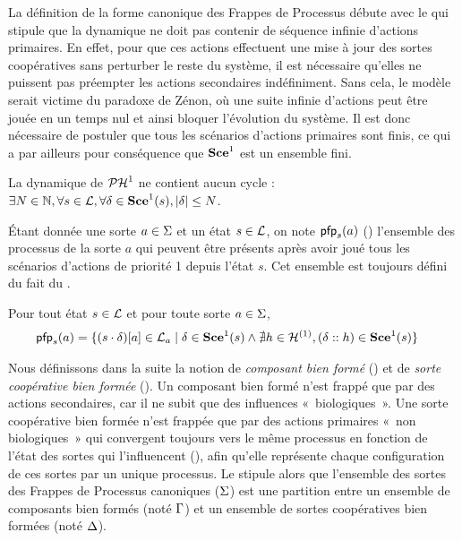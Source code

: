 La définition de la forme canonique des Frappes de Processus débute avec le
 qui stipule que la dynamique ne doit pas contenir de séquence infinie
d'actions primaires.
En effet, pour que ces actions effectuent une mise à jour des sortes coopératives sans perturber
le reste du système, il est nécessaire qu'elles ne puissent pas préempter les actions secondaires
indéfiniment.
Sans cela, le modèle serait victime du paradoxe de Zénon,
où une suite infinie d'actions peut être jouée en un temps nul et ainsi
bloquer l'évolution du système.
Il est donc nécessaire de postuler que tous les scénarios d'actions primaires sont finis,
ce qui a par ailleurs pour conséquence que $\mathbf{Sce}^1$ est un ensemble fini.

\begin{critere}
  La dynamique de $\mathcal{PH}^1$ ne contient aucun cycle :
  $\exists N \in \mathbb{N}, \forall s \in \mathcal{L}, \forall \delta \in \mathbf{Sce}^1(s),
    |\delta| \leq N$.
\end{critere}

Étant donnée une sorte $a \in \Sigma$ et un état $s \in \mathcal{L}$,
on note $\mathsf{pfp}_s(a)$ () l'ensemble des processus de la sorte $a$ qui peuvent être présents
après avoir joué tous les scénarios d'actions de priorité 1 depuis l'état $s$.
Cet ensemble est toujours défini du fait du .

\begin{definition}[$\pfp : \PHl \times \PHs \rightarrow \powerset(\PHproc)$]
  Pour tout état $s \in \mathcal{L}$ et pour toute sorte $a \in \Sigma$,
  \begin{align*}
    \mathsf{pfp}_s(a) = \{ (s\cdot\delta)[{a}] \in \mathcal{L}_a &\mid \delta \in \mathbf{Sce}^1(s)
          \wedge\nexists h\in\mathcal{H}^{(1)}, (\delta :: h) \in \mathbf{Sce}^1(s) \}
  \end{align*}
\end{definition}

Nous définissons dans la suite la notion de \emph{composant bien formé} ()
et de \emph{sorte coopérative bien formée} ().
Un composant bien formé n'est frappé que par des actions secondaires,
car il ne subit que des influences «~biologiques~».
Une sorte coopérative bien formée n'est frappée que par des actions primaires «~non biologiques~»
qui convergent toujours vers le même processus en fonction de l'état des sortes qui l'influencent
(), afin qu'elle représente chaque configuration de ces sortes par un unique processus.
Le  stipule alors que l'ensemble des sortes des Frappes de Processus canoniques
($\Sigma$) est une partition entre un ensemble de composants bien formés (noté $\Gamma$)
et un ensemble de sortes coopératives bien formées (noté $\Delta$).

